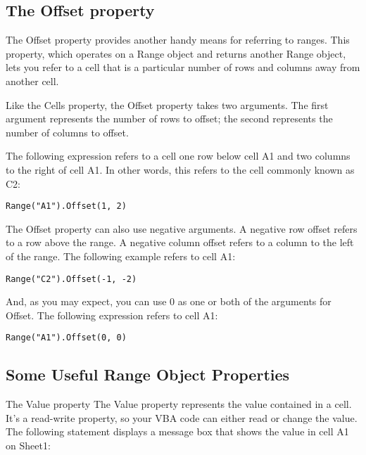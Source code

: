 \documentclass[
]{article}
\theoremstyle{definition}
\theoremstyle{definition}
\theoremstyle{definition}
\theoremstyle{definition}
\theoremstyle{remark}
\begin{document}
\hypertarget{the-offset-property}{%
\subsection{The Offset property}\label{the-offset-property}}

The Offset property provides another handy means for referring to ranges. This property, which operates on a Range object and returns another Range object, lets you refer to a cell that is a particular number of rows and columns away from another cell.

Like the Cells property, the Offset property takes two arguments. The first argument represents the number of rows to offset; the second represents the number of columns to offset.

The following expression refers to a cell one row below cell A1 and two columns to the right of cell A1. In other words, this refers to the cell commonly known as C2:

\begin{verbatim}
Range("A1").Offset(1, 2)
\end{verbatim}

The Offset property can also use negative arguments. A negative row offset refers to a row above the range. A negative column offset refers to a column to the left of the range. The following example refers to cell A1:

\begin{verbatim}
Range("C2").Offset(-1, -2)
\end{verbatim}

And, as you may expect, you can use 0 as one or both of the arguments for Offset. The following expression refers to cell A1:

\begin{verbatim}
Range("A1").Offset(0, 0)
\end{verbatim}

\hypertarget{some-useful-range-object-properties}{%
\subsection{Some Useful Range Object Properties}\label{some-useful-range-object-properties}}

The Value property The Value property represents the value contained in a cell. It's a read-write property, so your VBA code can either read
or change the value. The following statement displays a message box that
shows the value in cell A1 on Sheet1:
\end{document}
